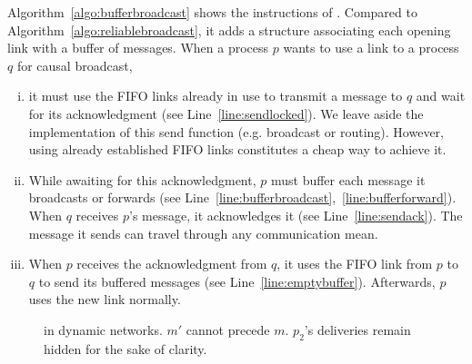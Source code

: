 Algorithm~\ref{algo:bufferbroadcast} shows the instructions of \CBROADCAST. 
Compared to Algorithm~\ref{algo:reliablebroadcast}, it adds a structure
associating each opening link with a buffer of messages.  When a process $p$
wants to use a link to a process $q$ for causal broadcast,
\begin{enumerate}[(i)]
\item it must use the FIFO links already in use to transmit a message to $q$
  and wait for its acknowledgment (see Line~\ref{line:sendlocked}). We leave
  aside the implementation of this send function (e.g. broadcast or
  routing). However, using already established FIFO links constitutes a cheap
  way to achieve it.
\item While awaiting for this acknowledgment, $p$ must buffer each message it
  broadcasts or forwards (see
  Line~\ref{line:bufferbroadcast},~\ref{line:bufferforward}). When $q$ receives
  $p$'s message, it acknowledges it (see Line~\ref{line:sendack}). The message
  it sends can travel through any communication mean.
\item When $p$ receives the acknowledgment from $q$, it uses the FIFO link
  from $p$ to $q$ to send its buffered messages (see
  Line~\ref{line:emptybuffer}). Afterwards, $p$ uses the new link normally.
\end{enumerate}

\begin{figure}
  \begin{center}
    
    \caption{\label{fig:solved}\CBROADCAST in dynamic networks. $m'$ cannot
      precede $m$. $p_2$'s deliveries remain hidden for the sake of clarity.}
  \end{center}
\end{figure}


